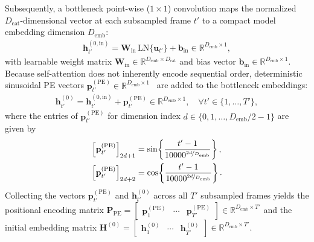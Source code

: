 \documentclass[lettersize,journal]{IEEEtran}
\begin{document}
Subsequently, a bottleneck point-wise ($1 \times 1$) convolution maps the normalized $D_{\mathrm{cat}}$-dimensional vector at each subsampled frame $t'$ to a compact model embedding dimension $D_{\mathrm{emb}}$:
\begin{align}
  \mathbf{h}_{t'}^{(0,\mathrm{in})} = \mathbf{W}_{\mathrm{in}} \, \mathrm{LN}\{\mathbf{u}_{t'}\} + \mathbf{b}_{\mathrm{in}} \in \mathbb{R}^{D_{\mathrm{emb}} \times 1},
  \label{eq:bottleneck_conv}
\end{align}
with learnable weight matrix $\mathbf{W}_{\mathrm{in}} \in \mathbb{R}^{D_{\mathrm{emb}} \times D_{\mathrm{cat}}}$ and bias vector $\mathbf{b}_{\mathrm{in}} \in \mathbb{R}^{D_{\mathrm{emb}} \times 1}$. Because self-attention does not inherently encode sequential order, deterministic sinusoidal \gls{PE} vectors $\mathbf{p}_{t'}^{(\mathrm{PE})} \in \mathbb{R}^{D_{\mathrm{emb}} \times 1}$~\cite{vaswani2017attention} are added to the bottleneck embeddings:
\begin{align}
  \mathbf{h}_{t'}^{(0)} = \mathbf{h}_{t'}^{(0,\mathrm{in})} + \mathbf{p}_{t'}^{(\mathrm{PE})} \in \mathbb{R}^{D_{\mathrm{emb}} \times 1}, \quad \forall t' \in \{1, \dots, T'\},
  \label{eq:pos_enc_add}
\end{align}
where the entries of $\mathbf{p}_{t'}^{(\mathrm{PE})}$ for dimension index $d \in \{0, 1, \dots, D_{\mathrm{emb}}/2 - 1\}$ are given by
\begin{align}
  \left[\mathbf{p}_{t'}^{(\mathrm{PE})}\right]_{2d+1} &= \sin\!\left\{ \frac{t' - 1}{10000^{\nicefrac{2d}{D_{\mathrm{emb}}}}} \right\}, \label{eq:pe_sin} \\
  \left[\mathbf{p}_{t'}^{(\mathrm{PE})}\right]_{2d+2} &= \cos\!\left\{ \frac{t' - 1}{10000^{\nicefrac{2d}{D_{\mathrm{emb}}}}} \right\}. \label{eq:pe_cos}
\end{align}
Collecting the vectors $\mathbf{p}_{t'}^{(\mathrm{PE})}$ and $\mathbf{h}_{t'}^{(0)}$ across all $T'$ subsampled frames yields the positional encoding matrix $\mathbf{P}_{\mathrm{PE}} = \begin{bmatrix} \mathbf{p}_1^{(\mathrm{PE})} & \cdots & \mathbf{p}_{T'}^{(\mathrm{PE})} \end{bmatrix} \in \mathbb{R}^{D_{\mathrm{emb}} \times T'}$ and the initial embedding matrix $\mathbf{H}^{(0)} = \begin{bmatrix} \mathbf{h}_1^{(0)} & \cdots & \mathbf{h}_{T'}^{(0)} \end{bmatrix} \in \mathbb{R}^{D_{\mathrm{emb}} \times T'}$.
\end{document}
